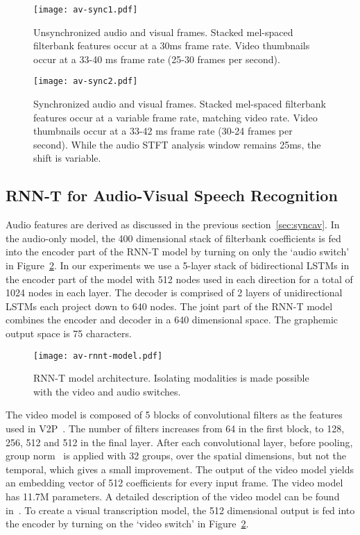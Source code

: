 \documentclass{article}
\newcommand{\negsectionspace}{\vspace{-4pt}}
\newcommand{\negfigspace}{\vspace{-4pt}}
\begin{document}
\begin{figure}[t]
\negfigspace
  \centering
  \texttt{[image: av-sync1.pdf]}
  \caption{Unsynchronized audio and visual frames. Stacked mel-spaced
    filterbank features occur at a 30ms frame rate.  Video thumbnails
    occur at a 33-40 ms frame rate (25-30 frames per second).}
  \label{fg:unsyncfeat}

  \texttt{[image: av-sync2.pdf]}
  \caption{Synchronized audio and visual frames. Stacked mel-spaced
    filterbank features occur at a variable frame rate, matching video
    rate. Video thumbnails occur at a 33-42 ms frame rate (30-24
    frames per second). While the audio STFT analysis window remains
    25ms, the shift is variable.}
  \label{fg:syncfeat}
\negfigspace
\vspace{-6pt}
\end{figure}

\subsection{RNN-T for Audio-Visual Speech Recognition}
\label{sec:rnntav}
\negsectionspace

Audio features are derived as discussed in the previous
section~\ref{sec:syncav}. In the audio-only model, the 400 dimensional
stack of filterbank coefficients is fed into the encoder part of the
RNN-T model by turning on only the `audio switch' in
Figure~\ref{fg:rnnt}. In our experiments we use a 5-layer stack of
bidirectional LSTMs in the encoder part of the model with 512 nodes used in each
direction for a total of 1024 nodes in each layer. The decoder is comprised of
2 layers of unidirectional LSTMs each project down to 640 nodes. The joint part
of the RNN-T model combines the encoder and decoder in a 640 dimensional space.
The graphemic output space is 75 characters.

\begin{figure}[th]
\negfigspace
  \centering
  \texttt{[image: av-rnnt-model.pdf]}
  \caption{RNN-T model architecture. Isolating modalities is made possible with
  the video and audio switches.}
  \label{fg:rnnt}
\negfigspace
\vspace{-6pt}
\end{figure}

The video model is composed of 5 blocks of 
convolutional filters as the features used in
V2P~\cite{dm_lsvsr_2019}.  The number of filters increases from 64 in
the first block, to 128, 256, 512 and 512 in the final layer. After
each convolutional layer, before pooling, group
norm~\cite{groupnorm18eccv} is applied with 32 groups, over the
spatial dimensions, but not the temporal, which gives a small
improvement. The output of the video model yields an embedding vector
of 512 coefficients for every input frame. The video model has 11.7M
parameters. A detailed description of the video model can be found
in~\cite{dm_lsvsr_2018}. To create a visual transcription model, the
512 dimensional output is fed into the encoder by turning on the
`video switch' in Figure~\ref{fg:rnnt}.
\end{document}
